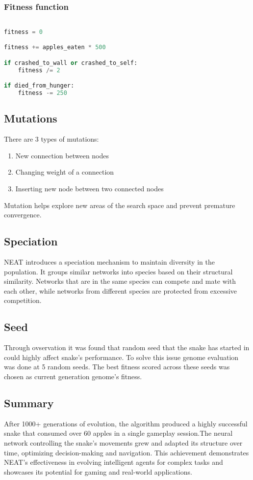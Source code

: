 \subsubsection{Fitness function}

\begin{lstlisting}[language=Python]

fitness = 0

fitness += apples_eaten * 500

if crashed_to_wall or crashed_to_self:
    fitness /= 2

if died_from_hunger:
    fitness -= 250

\end{lstlisting}

\subsection{Mutations}

There are 3 types of mutations:

\begin{enumerate}
    \item New connection between nodes
    \item Changing weight of a connection
    \item Inserting new node between two connected nodes 
\end{enumerate}

Mutation helps explore new areas of the search space and prevent premature convergence.

\subsection{Speciation}

NEAT introduces a speciation mechanism to maintain diversity in the population. It groups similar networks into species based on their structural similarity. Networks that are in the same species can compete and mate with each other, while networks from different species are protected from excessive competition.

\subsection{Seed}

Through ovservation it was found that random seed that the snake has started in could highly affect snake's performance. To solve this issue genome evaluation was done at 5 random seeds. The best fitness scored across these seeds was chosen as current generation genome's fitness.

\subsection{Summary}

After 1000+ generations of evolution, the algorithm produced a highly successful snake that consumed over 60 apples in a single gameplay session.The neural network controlling the snake's movements grew and adapted its structure over time, optimizing decision-making and navigation. This achievement demonstrates NEAT's effectiveness in evolving intelligent agents for complex tasks and showcases its potential for gaming and real-world applications.
